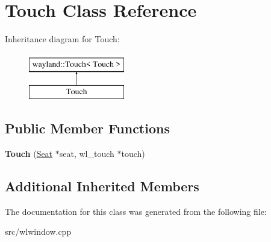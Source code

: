 \hypertarget{classTouch}{}\section{Touch Class Reference}
\label{classTouch}
Inheritance diagram for Touch\+:\begin{figure}[H]
\begin{center}
\leavevmode
\includegraphics[height=2.000000cm]{classTouch}
\end{center}
\end{figure}
\subsection*{Public Member Functions}
\begin{DoxyCompactItemize}
\item 
\mbox{\label{classTouch_a39bd9bab42509dc29b442c6fa28b3858}} 
{\bfseries Touch} (\mbox{\hyperlink{classSeat}{Seat}} $\ast$seat, wl\+\_\+touch $\ast$touch)
\end{DoxyCompactItemize}
\subsection*{Additional Inherited Members}


The documentation for this class was generated from the following file\+:\begin{DoxyCompactItemize}
\item 
src/wlwindow.\+cpp\end{DoxyCompactItemize}
